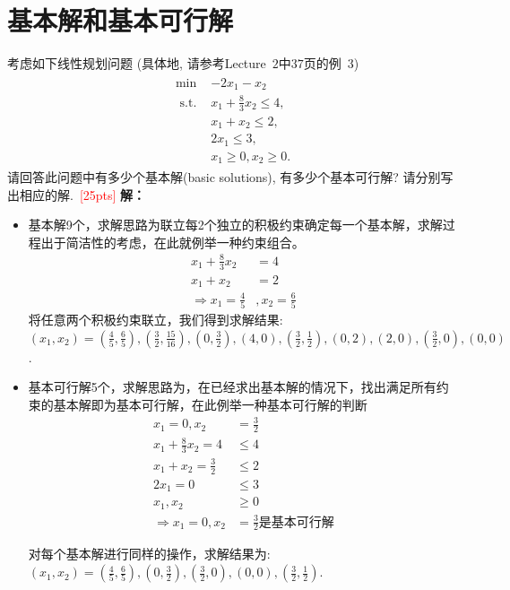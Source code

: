 \documentclass[10pt]{article}
\begin{document}
\section{基本解和基本可行解} 
考虑如下线性规划问题 (具体地, 请参考Lecture~$2$中$37$页的例~$3$)
\begin{equation}\label{eq: ex3}
	\begin{array}{c}
		\begin{aligned}
			\min~&-2 x_{1}-x_{2} \\
			\textrm { s.t. } &x_{1}+\frac{8}{3} x_{2} \leq 4, \\
			&x_{1}+x_{2} \leq 2, \\
			&2 x_{1} \leq 3, \\
			&x_{1} \geq 0, x_{2} \geq 0.
		\end{aligned}
	\end{array}
\end{equation}
请回答此问题中有多少个基本解(basic solutions), 有多少个基本可行解? 请分别写出相应的解.~\textcolor{red}{[25pts]}
\textbf{解：}
\begin{itemize}
\item 基本解9个，求解思路为联立每2个独立的积极约束确定每一个基本解，求解过程出于简洁性的考虑，在此就例举一种约束组合。
\begin{align*}
x_1+\frac{8}{3}x_2&=4\\
x_1+x_2&=2\\
\Rightarrow x_1 = \frac{4}{5}&, x_2=\frac{6}{5}
\end{align*}
将任意两个积极约束联立，我们得到求解结果: $(x_1,x_2)=(\frac{4}{5},\frac{6}{5}),(\frac{3}{2},\frac{15}{16}),(0,\frac{3}{2}),(4,0),(\frac{3}{2},\frac{1}{2}),(0,2),(2,0),(\frac{3}{2},0),(0,0)$.
\item 基本可行解5个，求解思路为，在已经求出基本解的情况下，找出满足所有约束的基本解即为基本可行解，在此例举一种基本可行解的判断
\begin{align*}
x_1 = 0,x_2&=\frac{3}{2}\\
x_1+\frac{8}{3}x_2=4&\le4\\
x_1+x_2=\frac{3}{2}&\le 2\\
2x_1=0&\le 3\\
x_1,x_2&\ge 0 \\
\Rightarrow x_1 = 0,x_2&=\frac{3}{2} \textbf{是基本可行解}
\end{align*}

对每个基本解进行同样的操作，求解结果为: $(x_1,x_2)=(\frac{4}{5},\frac{6}{5}), (0,\frac{3}{2}), (\frac{3}{2},0), (0,0),(\frac{3}{2},\frac{1}{2})$.
\end{itemize}
\end{document}
